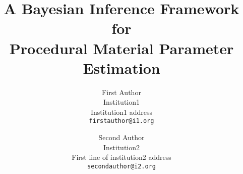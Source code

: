 \documentclass[10pt,twocolumn,letterpaper]{article}
\begin{document}
\title{A Bayesian Inference Framework for \\ Procedural Material Parameter Estimation}

\author{First Author\\
Institution1\\
Institution1 address\\
{\tt\small firstauthor@i1.org}
\and
Second Author\\
Institution2\\
First line of institution2 address\\
{\tt\small secondauthor@i2.org}
}

\maketitle

\begin{abstract}

\end{abstract}






% 
% 



{\small


}
\end{document}
